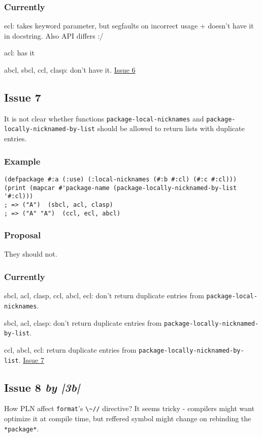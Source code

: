 \documentclass[11pt]{article}
\begin{document}
\subsubsection{Currently}
\label{sec:orgb0b06c4}
ecl: takes keyword parameter, but segfaults on incorrect usage + doesn't
have it in docstring. Also API differs :/

acl: has it

 abcl, sbcl, ccl, clasp: don't have it.
\href{./issues/6.org}{Issue 6}

\subsection{Issue 7}
\label{sec:org3415742}
It is not clear whether functions \texttt{package-local-nicknames} and
\texttt{package-locally-nicknamed-by-list} should be allowed to return lists with
duplicate entries.
\subsubsection{Example}
\label{sec:org03fd013}
\begin{verbatim}
(defpackage #:a (:use) (:local-nicknames (#:b #:cl) (#:c #:cl)))
(print (mapcar #'package-name (package-locally-nicknamed-by-list '#:cl)))
; => ("A")  (sbcl, acl, clasp)
; => ("A" "A")  (ccl, ecl, abcl)
\end{verbatim}
\subsubsection{Proposal}
\label{sec:org474a7e4}
They should not.
\subsubsection{Currently}
\label{sec:orge34534a}
sbcl, acl, clasp, ccl, abcl, ecl: don't return duplicate entries from \texttt{package-local-nicknames}.

sbcl, acl, clasp: don't return duplicate entries from \texttt{package-locally-nicknamed-by-list}.

 ccl, abcl, ecl: return duplicate entries from \texttt{package-locally-nicknamed-by-list}.
\href{./issues/7.org}{Issue 7}

\subsection{Issue 8 \emph{by |3b|}}
\label{sec:org1f7e711}
How PLN affect \texttt{format}'s \texttt{\textbackslash{}\textasciitilde{}//} directive? It seems tricky - compilers might
want optimize it at compile time, but reffered symbol might change on
rebinding the \texttt{*package*}.
\end{document}
